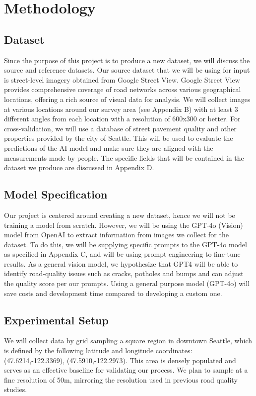 \documentclass{article}
\begin{document}
\section{Methodology}

\subsection{Dataset}
Since the purpose of this project is to produce a new dataset, we will discuss the source and reference datasets. Our source dataset that we will be using for input is street-level imagery obtained from Google Street View. Google Street View provides comprehensive coverage of road networks across various geographical locations, offering a rich source of visual data for analysis. We will collect images at various locations around our survey area (see Appendix B) with at least 3 different angles from each location with a resolution of 600x300 or better. For cross-validation, we will use a database of street pavement quality and other properties provided by the city of Seattle. This will be used to evaluate the predictions of the AI model and make sure they are aligned with the measurements made by people. The specific fields that will be contained in the dataset we produce are discussed in Appendix D.

\subsection{Model Specification}
Our project is centered around creating a new dataset, hence we will not be training a model from scratch. However, we will be using the GPT-4o (Vision) model from OpenAI to extract information from images we collect for the dataset. To do this, we will be supplying specific prompts to the GPT-4o model as specified in Appendix C, and will be using prompt engineering to fine-tune results. As a general vision model, we hypothesize that GPT4 will be able to identify road-quality issues such as cracks, potholes and bumps and can adjust the quality score per our prompts. Using a general purpose model (GPT-4o) will save costs and development time compared to developing a custom one.

\subsection{Experimental Setup}
We will collect data by grid sampling a square region in downtown Seattle, which is defined by the following latitude and longitude coordinates: (47.6214,-122.3369), (47.5910,-122.2973). This area is densely populated and serves as an effective baseline for validating our process. We plan to sample at a fine resolution of 50m, mirroring the resolution used in previous road quality studies.
\end{document}
